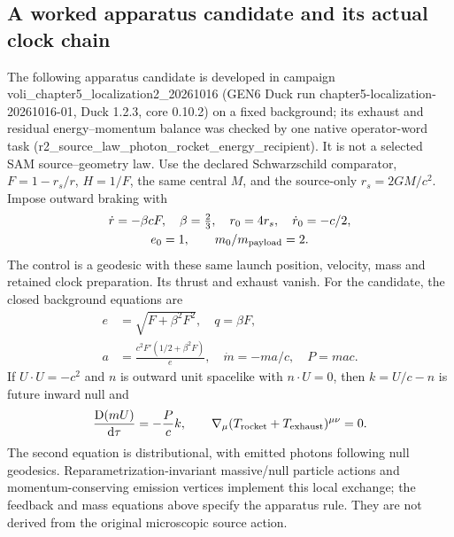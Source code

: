\documentclass[10pt,twocolumn,letterpaper]{article}
\newcommand{\dd}{\mathrm{d}}
\begin{document}
\subsection{A worked apparatus candidate and its actual clock chain}
The following apparatus candidate is developed in campaign
voli\_chapter5\_localization2\_20261016 (GEN6 Duck run
chapter5-localization-20261016-01, Duck 1.2.3, core 0.10.2) on a fixed
background; its exhaust and residual energy--momentum balance was checked
by one native operator-word task
(r2\_source\_law\_photon\_rocket\_energy\_recipient). It is not a selected SAM
source--geometry law. Use the declared Schwarzschild comparator,
$F=1-r_s/r$, $H=1/F$, the same central $M$, and the source-only
$r_s=2GM/c^2$. Impose outward braking with
\begin{equation}
 \begin{gathered}
 \dot r=-\beta cF,\quad\beta=\tfrac23,\quad
 r_0=4r_s,\quad\dot r_0=-c/2,\\
 e_0=1,\qquad m_0/m_{\rm payload}=2 .
 \end{gathered}
\end{equation}
The control is a geodesic with these same launch position, velocity,
mass and retained clock preparation. Its thrust and exhaust vanish.
For the candidate, the closed background equations are
\begin{equation}
 \begin{split}
 e&=\sqrt{F+\beta^2F^2},\quad q=\beta F,\\
 a&=\frac{c^2F'(1/2+\beta^2F)}{e},\quad
 \dot m=-ma/c,\quad P=mac .
 \end{split}
\end{equation}
If $U\cdot U=-c^2$ and $n$ is outward unit spacelike with $n\cdot U=0$,
then $k=U/c-n$ is future inward null and
\begin{equation}
 \frac{\mathrm D(mU)}{\dd\tau}=-\frac Pc k,\qquad
 \nabla_\mu(T_{\rm rocket}+T_{\rm exhaust})^{\mu\nu}=0 .
\end{equation}
The second equation is distributional, with emitted photons following
null geodesics. Reparametrization-invariant massive/null particle
actions and momentum-conserving emission vertices implement this local
exchange; the feedback and mass equations above specify the apparatus
rule. They are not derived from the original microscopic source action.
\end{document}
